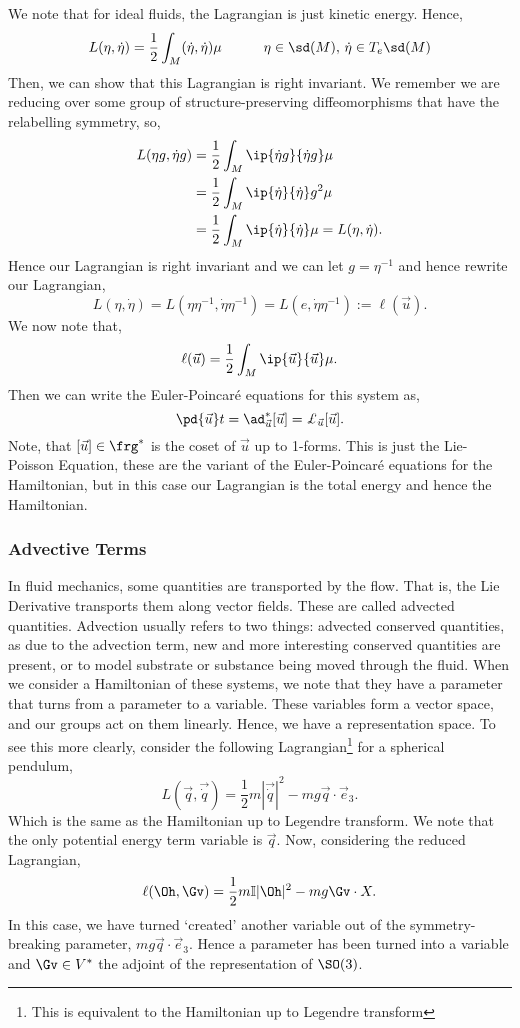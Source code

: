 \noindent
We note that for ideal fluids, the Lagrangian is just kinetic energy. Hence,
$$ L(\eta, \dot \eta) = \frac{1}{2}\int_M (\dot \eta, \dot \eta) \mu \qquad \quad \eta \in \sd (M),\, \dot \eta \in T_e\sd (M)$$
Then, we can show that this Lagrangian is right invariant. We remember we are reducing over some group of structure-preserving diffeomorphisms that have the relabelling symmetry, so,
\begin{align*}
  L(\eta g, \dot \eta g) &= \frac{1}{2}\int_M \ip{\dot \eta g}{\dot \eta g}\mu \\
  &= \frac{1}{2}\int_M \ip{\dot \eta}{\dot \eta} g^2\mu \\
  &= \frac{1}{2}\int_M \ip{\dot \eta}{\dot \eta}\mu  = L(\eta, \dot \eta).
\end{align*}
\noindent
Hence our Lagrangian is right invariant and we can let $g = \eta^{-1}$ and hence rewrite our Lagrangian,
$$ L(\eta, \dot \eta) = L(\eta\eta^{-1}, \dot \eta \eta^{-1}) = L(e, \dot \eta \eta^{-1}) := \ell({\vec u}). $$
We now note that,
$$ \ell({\vec u}) = \frac{1}{2}\int_M \ip{{\vec u}}{{\vec u}}\mu. $$
Then we can write the Euler-Poincar\'e equations for this system as,
$$ \pd {\vec u} t = \ad^*_{\vec u}{[\vec u]} = \pounds_{\vec u} [{\vec u}]. $$
Note, that $[\vec u]\in \frg^*$ is the coset of $\vec u$ up to 1-forms. This is just the Lie-Poisson Equation, these are the variant of the Euler-Poincar\'e equations for the Hamiltonian, but in this case our Lagrangian is the total energy and hence the Hamiltonian.\\

\subsubsection{Advective Terms}
In fluid mechanics, some quantities are transported by the flow. That is, the Lie Derivative transports them along vector fields. These are called advected quantities. Advection usually refers to two things: advected conserved quantities, as due to the advection term, new and more interesting conserved quantities are present, or to model substrate or substance being moved through the fluid. When we consider a Hamiltonian of these systems, we note that they have a parameter that turns from a parameter to a variable. These variables form a vector space, and our groups act on them linearly. Hence, we have a representation space. To see this more clearly, consider the following Lagrangian\footnote{This is equivalent to the Hamiltonian up to Legendre transform} for a spherical pendulum,
$$ L(\vec q, \vec{\dot q}) = \frac{1}{2}m |\vec{\dot q}|^2 - mg \vec q \cdot \vec e_3. $$
Which is the same as the Hamiltonian up to Legendre transform. We note that the only potential energy term variable is $\vec q$. Now, considering the reduced Lagrangian,
$$ \ell(\Oh, \Gv) = \frac{1}{2}m \mathbb{I}|\Oh|^2 - mg\Gv \cdot X. $$
In this case, we have turned `created' another variable out of the symmetry-breaking parameter, $mg \vec q \cdot \vec e_3$. Hence a parameter has been turned into a variable and $\Gv \in V^*$ the adjoint of the representation of $\SO(3)$.\\

